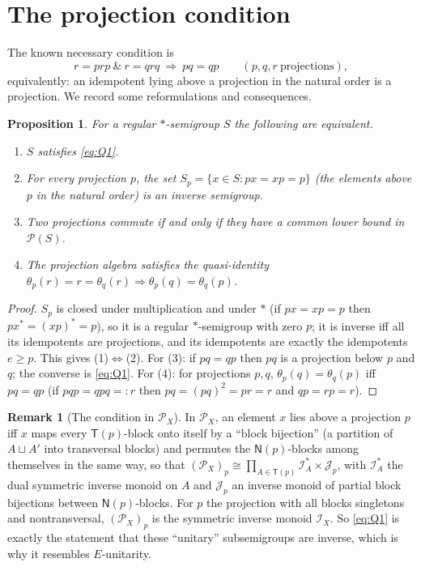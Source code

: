 \documentclass[11pt]{amsart}
\newtheorem{proposition}[theorem]{Proposition}
\theoremstyle{definition}
\newtheorem{remark}[theorem]{Remark}
\renewcommand{\P}{\mathcal{P}}
\newcommand{\T}{\mathsf{T}}
\newcommand{\N}{\mathsf{N}}
\begin{document}
\section{The projection condition}\label{sec:Q1}

The known necessary condition is
\begin{equation}\label{eq:Q1}\tag{Q1}
r=prp\ \&\ r=qrq\ \Longrightarrow\ pq=qp\qquad(p,q,r\ \text{projections}),
\end{equation}
equivalently: an idempotent lying above a projection in the natural order is a projection. We record some reformulations and consequences.

\begin{proposition}\label{prop:Q1}
For a regular $*$-semigroup $S$ the following are equivalent.
\begin{enumerate}[label=\textup{(\arabic*)}]
\item $S$ satisfies \eqref{eq:Q1}.
\item For every projection $p$, the set $S_p=\{x\in S: px=xp=p\}$ (the elements above $p$ in the natural order) is an inverse semigroup.
\item Two projections commute if and only if they have a common lower bound in $\P(S)$.
\item The projection algebra satisfies the quasi-identity $\theta_p(r)=r=\theta_q(r)\Rightarrow\theta_p(q)=\theta_q(p)$.
\end{enumerate}
\end{proposition}

\begin{proof}
$S_p$ is closed under multiplication and under $*$ (if $px=xp=p$ then $px^*=(xp)^*=p$), so it is a regular $*$-semigroup with zero $p$; it is inverse iff all its idempotents are projections, and its idempotents are exactly the idempotents $e\ge p$. This gives (1)$\Leftrightarrow$(2). For (3): if $pq=qp$ then $pq$ is a projection below $p$ and $q$; the converse is \eqref{eq:Q1}. For (4): for projections $p,q$, $\theta_p(q)=\theta_q(p)$ iff $pq=qp$ (if $pqp=qpq=:r$ then $pq=(pq)^2=pr=r$ and $qp=rp=r$).
\end{proof}

\begin{remark}[The condition in $\P_X$]\label{rem:Sp}
In $\P_X$, an element $x$ lies above a projection $p$ iff $x$ maps every $\T(p)$-block onto itself by a ``block bijection'' (a partition of $A\sqcup A'$ into transversal blocks) and permutes the $\N(p)$-blocks among themselves in the same way, so that $(\P_X)_p\cong\prod_{A\in\T(p)}\mathcal I^*_A\times\mathcal J_p$, with $\mathcal I^*_A$ the dual symmetric inverse monoid on $A$ and $\mathcal J_p$ an inverse monoid of partial block bijections between $\N(p)$-blocks. For $p$ the projection with all blocks singletons and nontransversal, $(\P_X)_p$ is the symmetric inverse monoid $\mathcal I_X$. So \eqref{eq:Q1} is exactly the statement that these ``unitary'' subsemigroups are inverse, which is why it resembles $E$-unitarity.
\end{remark}
\end{document}
